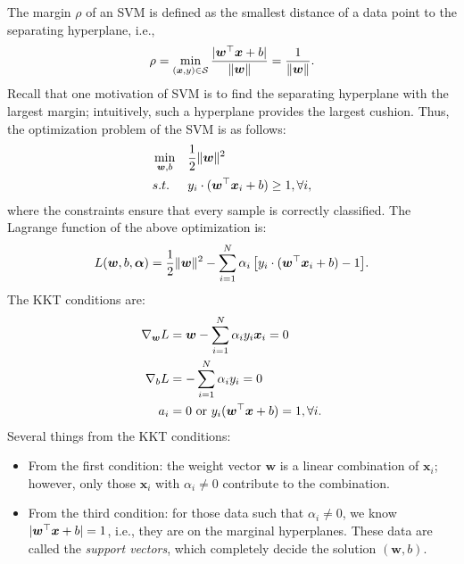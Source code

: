         The margin $\rho$ of an SVM is defined as the smallest distance of a data point to the separating hyperplane, i.e., 
            \begin{equation}
                \rho = \min_{(\bm{x}, y) \in \mathcal{S}} \frac{| \bm{w}^\top \bm{x} + b |}{\lVert\bm{w}\rVert} = \frac{1}{\lVert\bm{w}\rVert}.
            \end{equation}
        Recall that one motivation of SVM is to find the separating hyperplane with the largest margin; intuitively, such a hyperplane provides the largest cushion.
        Thus, the optimization problem of the SVM is as follows:
            \begin{equation}
                \begin{aligned}
                    & \min_{\bm{w}, b} & & \frac{1}{2}\lVert\bm{w}\rVert^2 \\
                    & s.t.             & & y_i \cdot (\bm{w}^\top \bm{x}_i + b) \ge 1, \forall i,
                \end{aligned}
            \end{equation}
        where the constraints ensure that every sample is correctly classified.
        The Lagrange function of the above optimization is:
            \begin{equation}
                L(\bm{w}, b, \bm{\alpha}) = \frac{1}{2}\lVert\bm{w}\rVert^2 - \sum_{i=1}^{N}{\alpha_i \left[ y_i \cdot (\bm{w}^\top \bm{x}_i + b) - 1\right]}.
            \end{equation}
        The KKT conditions are:
            \begin{equation}
                \begin{aligned}
                    \nabla_{\bm{w}} L & = \bm{w} - \sum_{i=1}^{N}{\alpha_i y_i \bm{x}_i} = 0 \\
                    \nabla_{b} L & = -\sum_{i=1}^{N}{\alpha_i y_i} = 0 \\
                    a_i & = 0 \text{ or } y_i(\bm{w}^\top \bm{x} + b) = 1, \forall i.
                \end{aligned}
            \end{equation}
        Several things from the KKT conditions:
            \begin{itemize}
                \item From the first condition: the weight vector $\bm{w}$ is a linear combination of $\bm{x}_i$; however, only those $\bm{x}_i$ with $\alpha_i \ne 0$ contribute to the combination.
                \item From the third condition: for those data such that $\alpha_i \ne 0$, we know $| \bm{w}^\top \bm{x} + b | = 1$, i.e., they are on the marginal hyperplanes. These data are called the \emph{support vectors}, which completely decide the solution $(\bm{w}, b)$.
            \end{itemize}
